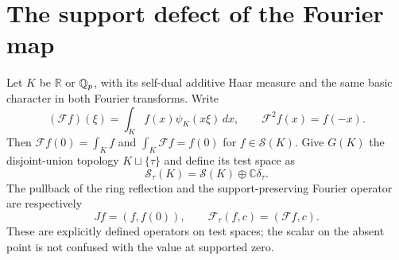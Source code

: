 \documentclass[11pt,a4paper]{article}
\theoremstyle{definition}\newtheorem{definition}[theorem]{Definition}
\newcommand{\C}{\mathbb C}\newcommand{\R}{\mathbb R}
\newcommand{\Sch}{\mathcal S}\newcommand{\im}{\operatorname{im}}
\begin{document}
\section{The support defect of the Fourier map}
\label{sec:fourier-support}
Let $K$ be $\R$ or $\mathbb Q_p$, with its self-dual additive Haar measure and the same basic character in both Fourier transforms. Write
\[
 (\mathcal F f)(\xi)=\int_K f(x)\psi_K(x\xi)\,dx,
 \qquad \mathcal F^2 f(x)=f(-x).
\]
Then $\mathcal Ff(0)=\int_Kf$ and $\int_K\mathcal Ff=f(0)$ for $f\in\Sch(K)$.
Give $G(K)$ the disjoint-union topology $K\sqcup\{\tau\}$ and define its test space as
\[
 \Sch_\tau(K)=\Sch(K)\oplus\C\delta_\tau.
\]
The pullback of the ring reflection and the support-preserving Fourier operator are respectively
\[
 Jf=(f,f(0)),\qquad \mathcal F_\tau(f,c)=(\mathcal Ff,c).
\]
These are explicitly defined operators on test spaces; the scalar on the absent point is not confused with the value at supported zero.
\end{document}

